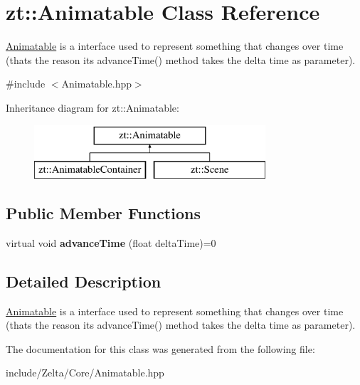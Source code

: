 \hypertarget{classzt_1_1_animatable}{}\section{zt\+:\+:Animatable Class Reference}
\label{classzt_1_1_animatable}


\hyperlink{classzt_1_1_animatable}{Animatable} is a interface used to represent something that changes over time (that\textquotesingle{}s the reason its advance\+Time() method takes the delta time as parameter).  




{\ttfamily \#include $<$Animatable.\+hpp$>$}

Inheritance diagram for zt\+:\+:Animatable\+:\begin{figure}[H]
\begin{center}
\leavevmode
\includegraphics[height=2.000000cm]{classzt_1_1_animatable}
\end{center}
\end{figure}
\subsection*{Public Member Functions}
\begin{DoxyCompactItemize}
\item 
\mbox{\label{classzt_1_1_animatable_a9d411c0fb6df48f5d6e5c6f72ee1019e}} 
virtual void {\bfseries advance\+Time} (float delta\+Time)=0
\end{DoxyCompactItemize}


\subsection{Detailed Description}
\hyperlink{classzt_1_1_animatable}{Animatable} is a interface used to represent something that changes over time (that\textquotesingle{}s the reason its advance\+Time() method takes the delta time as parameter). 

The documentation for this class was generated from the following file\+:\begin{DoxyCompactItemize}
\item 
include/\+Zelta/\+Core/Animatable.\+hpp\end{DoxyCompactItemize}
